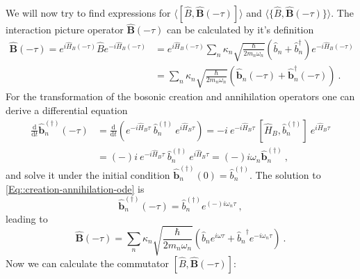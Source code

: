 	We will now try to find expressions for $\langle [\hat{B}, \boldsymbol{\hat{B}}(-\tau) ]  \rangle$ and $\langle  \{\hat{B}, \boldsymbol{\hat{B}}(-\tau) \}  \rangle$. The interaction picture operator $\boldsymbol{\hat{B}}(-\tau)$ can be calculated by it's definition
	\begin{equation}
		\begin{split}
			\boldsymbol{\hat{B}}(-\tau) =	e^{i \hat{H}_B (-\tau)} \hat{B} e^{- i \hat{H}_B (-\tau)} &=	 e^{i \hat{H}_B (-\tau)} \sum_n \kappa_n \sqrt{\frac{\hbar}{2 m_n \omega_n}} \left(\hat{b}_n + \hat{b}_n^\dagger\right) e^{- i \hat{H}_B (-\tau)} \\
			&=	\sum_n \kappa_n \sqrt{\frac{\hbar}{2 m_n \omega_n}} \left(\boldsymbol{\hat{b}}_n(-\tau) + \boldsymbol{\hat{b}}_n^\dagger(-\tau) \right)~.
		\end{split}
	\end{equation}
	For the transformation of the bosonic creation and annihilation operators one can derive a differential equation
	\begin{equation} \label{Eq::creation-annihilation-ode}
		\begin{split}
			\frac{\text{d}}{\text{d}t} \boldsymbol{\hat{b}}^{(\dagger)}_n(-\tau) &=	\frac{\text{d}}{\text{d}t} \left(e^{- i \hat{H}_B \tau}~ \hat{b}_n^{(\dagger)}~e^{ i \hat{H}_B \tau}\right) = -i~e^{- i \hat{H}_B \tau}~ \left[\hat{H}_B, \hat{b}_n^{(\dagger)}\right]~e^{i \hat{H}_B \tau} \\
			&=	(-)i~e^{- i \hat{H}_B \tau}~ \hat{b}_n^{(\dagger)}~e^{i \hat{H}_B \tau}  =	(-)i\omega_n \boldsymbol{\hat{b}}_n^{(\dagger)}~,
		\end{split}
	\end{equation}
	and solve it under the initial condition $\boldsymbol{\hat{b}}_n^{(\dagger)}(0) = \hat{b}_n^{(\dagger)}	$. The solution to \autoref{Eq::creation-annihilation-ode} is
	\begin{equation}
		\boldsymbol{\hat{b}}_n^{(\dagger)}(-\tau) = \hat{b}_n^{(\dagger)} e^{(-)i\omega_n \tau}~,
	\end{equation}
	leading to
	\begin{equation}
		\boldsymbol{\hat{B}}(-\tau) =	\sum_n \kappa_n \sqrt{\frac{\hbar}{2 m_n \omega_n}} \left({\hat{b}_n}e^{i \omega \tau} + {\hat{b}_n}^\dagger e^{-i \omega_n \tau} \right)~.
	\end{equation}
	Now we can calculate the commutator $[\hat{B}, \boldsymbol{\hat{B}}(-\tau) ]$:
